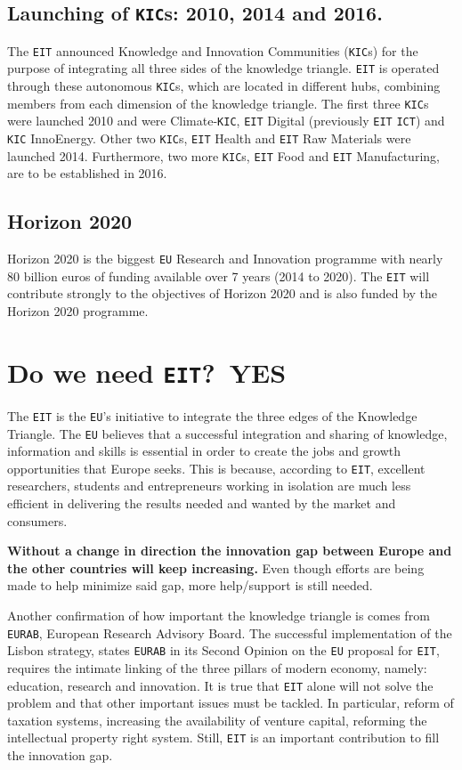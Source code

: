 \documentclass[11pt,a4paper,oneside,twocolumn]{IEEEtran}
\begin{document}
\subsection{Launching of \texttt{KIC}s: 2010, 2014 and 2016.}
The \texttt{EIT} announced Knowledge and Innovation Communities (\texttt{KIC}s) for the purpose of integrating all three sides of the knowledge triangle. \texttt{EIT} is operated through these autonomous \texttt{KIC}s, which are located in different hubs, combining members from each dimension of the knowledge triangle. The first three \texttt{KIC}s were launched 2010 and were Climate-\texttt{KIC}, \texttt{EIT} Digital (previously \texttt{EIT} \texttt{ICT}) and \texttt{KIC} InnoEnergy. Other two \texttt{KIC}s, \texttt{EIT} Health and \texttt{EIT} Raw Materials were launched 2014. Furthermore, two more \texttt{KIC}s, \texttt{EIT} Food and \texttt{EIT} Manufacturing, are to be established in 2016\cite{3_8}\cite{3_9}.

\subsection{Horizon 2020}
Horizon 2020 is the biggest \texttt{EU} Research and Innovation programme with nearly 80 billion euros of funding available over 7 years (2014 to 2020)\cite{3_20}. The \texttt{EIT} will contribute strongly to the objectives of Horizon 2020 and is also funded by the Horizon 2020 programme\cite{3_7}.


\section{Do we need \texttt{EIT}?\ YES}\label{sec:EIT-Yes}
The \texttt{EIT} is the \texttt{EU}'s initiative to integrate the three edges of the Knowledge Triangle. The \texttt{EU} believes that a successful integration and sharing of knowledge, information and skills is essential in order to create the jobs and growth opportunities that Europe seeks. This is because, according to \texttt{EIT}, excellent researchers, students and entrepreneurs working in isolation are much less efficient in delivering the results needed and wanted by the market and consumers.

\textbf{Without a change in direction the innovation gap between Europe and the other countries will keep increasing.} Even though efforts are being made to help minimize said gap, more help/support is still needed.

Another confirmation of how important the knowledge triangle is comes from \texttt{EURAB}, European Research Advisory Board. The successful implementation of the Lisbon strategy, states \texttt{EURAB} in its Second Opinion on the \texttt{EU} proposal for \texttt{EIT}, requires the intimate linking of the three pillars of modern economy, namely: education, research and innovation. It is true that \texttt{EIT} alone will not solve the problem and that other important issues must be tackled. In particular, reform of taxation systems, increasing the availability of venture capital, reforming the intellectual property right system. Still, \texttt{EIT} is an important contribution to fill the innovation gap\cite{4_1}.
\end{document}

